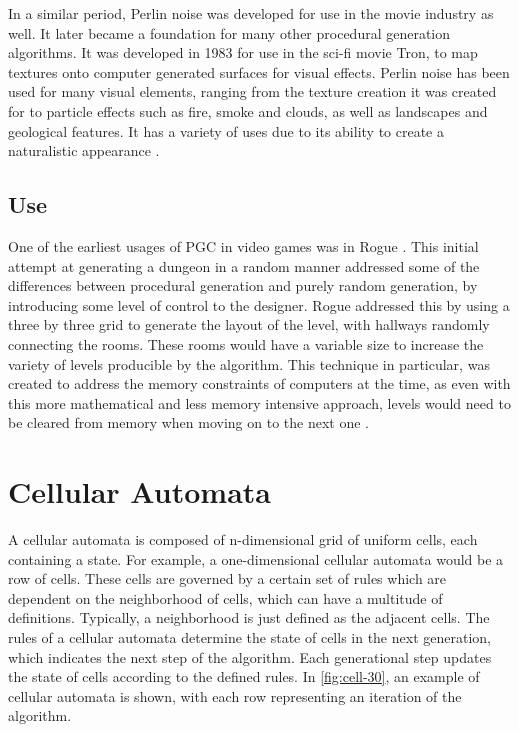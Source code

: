\documentclass[10pt]{report}
\begin{document}
		In a similar period, Perlin noise was developed for use in the movie industry as well. It later became a foundation for many other procedural generation algorithms. It was developed in 1983 for use in the sci-fi movie Tron, to map textures onto computer generated surfaces for visual effects. Perlin noise has been used for many visual elements, ranging from the texture creation it was created for to particle effects such as fire, smoke and clouds, as well as landscapes and geological features. It has a variety of uses due to its ability to create a naturalistic appearance \cite{10.1145/325165.325247}.
		
		\section{Use}
		One of the earliest usages of PGC in video games was in Rogue \cite{rogue}. This initial attempt at generating a dungeon in a random manner addressed some of the differences between procedural generation and purely random generation, by introducing some level of control to the designer. Rogue addressed this by using a three by three grid to generate the layout of the level, with hallways randomly connecting the rooms. These rooms would have a variable size to increase the variety of levels producible by the algorithm. This technique in particular, was created to address the memory constraints of computers at the time, as even with this more mathematical and less memory intensive approach, levels would need to be cleared from memory when moving on to the next one \cite{rogue}.
		

	\vspace{10pt}
	\let\clearpage\relax
	\chapter{Cellular Automata}
		A cellular automata is composed of n-dimensional grid of uniform cells, each containing a state. For example, a one-dimensional cellular automata would be a row of cells. These cells are governed by a certain set of rules which are dependent on the neighborhood of cells, which can have a multitude of definitions. Typically, a neighborhood is just defined as the adjacent cells. The rules of a cellular automata determine the state of cells in the next generation, which indicates the next step of the algorithm. Each generational step updates the state of cells according to the defined rules. In \autoref{fig:cell-30}, an example of cellular automata is shown, with each row representing an iteration of the algorithm.
		
\end{document}
